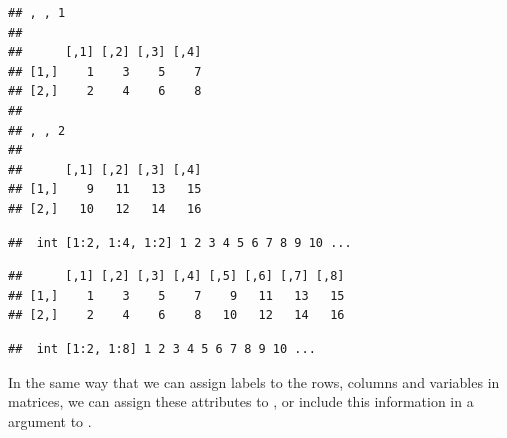 \documentclass[11pt]{book}
\renewenvironment{knitrout}{\small\renewcommand{\baselinestretch}{.85}}{} %
\begin{document}
\begin{knitrout}
\color{fgcolor}\begin{kframe}
\begin{alltt}
 \hlkwb{<-} \hlstd{(}\hlopt{:}\hlstd{,} \hlstd{=}\hlstd{(}\hlstd{,} \hlstd{,} \hlstd{)))}     
\end{alltt}
\begin{verbatim}
## , , 1
## 
##      [,1] [,2] [,3] [,4]
## [1,]    1    3    5    7
## [2,]    2    4    6    8
## 
## , , 2
## 
##      [,1] [,2] [,3] [,4]
## [1,]    9   11   13   15
## [2,]   10   12   14   16
\end{verbatim}
\begin{alltt}
\end{alltt}
\begin{verbatim}
##  int [1:2, 1:4, 1:2] 1 2 3 4 5 6 7 8 9 10 ...
\end{verbatim}
\begin{alltt}
 \hlkwb{<-} \hlstd{(}\hlopt{:}\hlstd{,} \hlstd{=}\hlstd{(}\hlstd{,} \hlstd{)))}        
\end{alltt}
\begin{verbatim}
##      [,1] [,2] [,3] [,4] [,5] [,6] [,7] [,8]
## [1,]    1    3    5    7    9   11   13   15
## [2,]    2    4    6    8   10   12   14   16
\end{verbatim}
\begin{alltt}
\end{alltt}
\begin{verbatim}
##  int [1:2, 1:8] 1 2 3 4 5 6 7 8 9 10 ...
\end{verbatim}
\end{kframe}
\end{knitrout}
In the same way that we can assign labels to the rows, columns and variables
in matrices, we can assign these attributes to , or
include this information in a  argument to .
\end{document}
